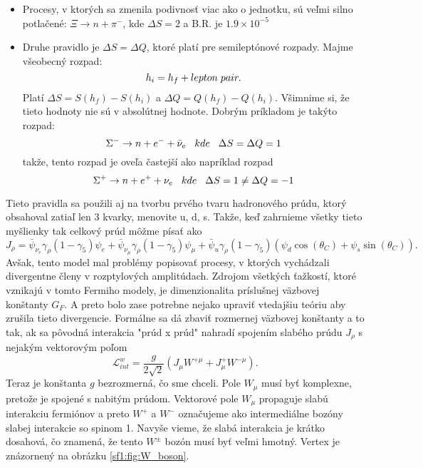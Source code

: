 \documentclass[../../main.tex]{subfiles}
\begin{document}
\begin{itemize}
	\item Procesy, v ktorých sa zmenila podivnosť viac ako o jednotku, sú veľmi silno potlačené: $\Xi\rightarrow n+\pi^{-}$, kde $\Delta S=2$ a B.R. je $1.9\times 10^{-5}$
	\item Druhe pravidlo je $\Delta S = \Delta Q$, ktoré platí pre semileptónové rozpady. Majme všeobecný rozpad: $$
		h_i=h_f+lepton \hspace{0.1cm} pair.
		$$ 
	Platí $\Delta S = S(h_f)-S(h_i)$ a $\Delta Q = Q(h_f)-Q(h_i)$. Všimnime si, že tieto hodnoty nie sú v absolútnej hodnote. Dobrým príkladom je takýto rozpad:
	$$
		\Sigma^-\rightarrow n+e^-+\bar{\nu}_e \hspace{0.3cm} kde \hspace{0.3cm} \Delta S=\Delta Q = 1
	$$
	takže, tento rozpad je oveľa častejší ako napríklad rozpad 
	$$
		\Sigma^+\rightarrow n+e^++\nu_e \hspace{0.3cm} kde \hspace{0.3cm} \Delta S=1 \neq \Delta Q = -1
	$$
\end{itemize}
Tieto pravidla sa použili aj na tvorbu prvého tvaru hadronového prúdu, ktorý obsahoval zatiaľ len 3 kvarky, menovite u, d, s. Takže, keď zahrnieme všetky tieto myšlienky tak celkový prúd môžme písať ako
\begin{equation}
J_{\rho}=\bar{\psi}_{\nu_{e}}\gamma_{\rho}(1-\gamma_5)\psi_{e} + \bar{\psi}_{\nu_{\mu}}\gamma_{\rho}(1-\gamma_5)\psi_{\mu}+\bar{\psi}_{u}\gamma_{\rho}(1-\gamma_5)(\psi_{d}\cos(\theta_C)+\psi_s\sin(\theta_C)).
\end{equation}
Avšak, tento model mal problémy popisovať procesy, v ktorých vychádzali divergentne členy v rozptylových amplitúdach. Zdrojom všetkých ťažkostí, ktoré vznikajú v tomto Fermiho modely, je dimenzionalita príslušnej väzbovej konštanty $G_F$. A preto bolo zase potrebne nejako upraviť vtedajšiu teóriu aby zrušila tieto divergencie. Formálne sa dá zbaviť rozmernej väzbovej konštanty a to tak, ak sa pôvodná interakcia "prúd x prúd" nahradí spojením slabého prúdu $J_{\rho}$ s nejakým vektorovým poľom
\begin{equation}
\mathcal{L}_{int}^{w}=\frac{g}{2\sqrt{2}}(J_{\mu}W^{+\mu}+J_{\mu}^+W^{-\mu}). 
\end{equation}
Teraz je konštanta $g$ bezrozmerná, čo sme chceli. Pole $W_{\mu}$ musí byť komplexne, pretože je spojené s nabitým prúdom. Vektorové pole $W_{\mu}$ propaguje slabú interakciu fermiónov a preto $W^+$ a $W^-$ označujeme ako intermediálne bozóny slabej interakcie so spinom 1. Navyše vieme, že slabá interakcia je krátko dosahová, čo znamená, že tento $W^{\pm}$ bozón musí byť veľmi hmotný. Vertex je znázornený na obrázku \ref{sf1:fig:W_boson}.
\end{document}
